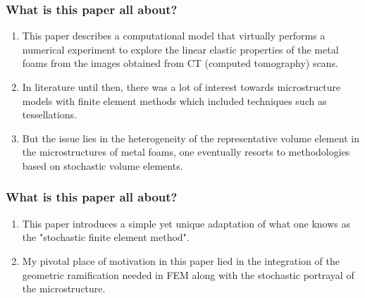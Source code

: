 \documentclass{beamer}
\begin{document}
\begin{frame}
\frametitle{What is this paper all about?}
\begin{enumerate}
	\item This paper describes a computational model that virtually performs a numerical experiment to explore the linear elastic properties of the metal foams from the images obtained from CT (computed tomography) scans.
	\item In literature until then, there was a lot of interest towards microstructure models with finite element methods which included techniques such as tessellations.
	\item But the issue lies in the heterogeneity of the representative volume element in the microstructures of metal foams, one eventually resorts to methodologies based on stochastic volume elements.
\end{enumerate}
\end{frame}

\begin{frame}
\frametitle{What is this paper all about?}
\begin{enumerate}
	\item This paper introduces a simple yet unique adaptation of what one knows as the "stochastic finite element method".
	\item My pivotal place of motivation in this paper lied in the integration of the geometric ramification needed in FEM along with the stochastic portrayal of the microstructure.
\end{enumerate}
\end{frame}
\end{document}
